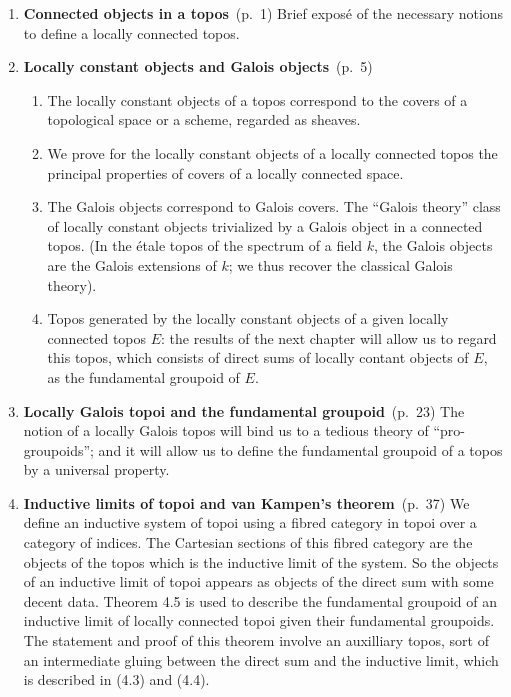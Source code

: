 \documentclass[10pt]{amsart}
\begin{document}
\begin{enumerate}[label=\arabic*.]
  \item \textbf{Connected objects in a topos}~(p.~1)
    Brief expos\'e of the necessary notions to define a locally connected topos.
  \item \textbf{Locally constant objects and Galois objects}~(p.~5)
    \begin{enumerate}[label=2.\arabic*.]
      \item The locally constant objects of a topos correspond to the covers of a topological space or a scheme, regarded as sheaves.
      \item We prove for the locally constant objects of a locally connected topos the principal properties of covers of a locally connected space.
      \item The Galois objects correspond to Galois covers.
        The ``Galois theory'' class of locally constant objects trivialized by a Galois object in a connected topos.
        (In the \'etale topos of the spectrum of a field $k$, the Galois objects are the Galois extensions of $k$;
        we thus recover the classical Galois theory).
      \item Topos generated by the locally constant objects of a given locally connected topos $E$:
        the results of the next chapter will allow us to regard this topos, which consists of direct sums of locally contant objects of $E$, as the fundamental groupoid of $E$.
    \end{enumerate}
  \item \textbf{Locally Galois topoi and the fundamental groupoid}~(p.~23)
    The notion of a locally Galois topos will bind us to a tedious theory of ``pro-groupoids'';
    and it will allow us to define the fundamental groupoid of a topos by a universal property.
  \item \textbf{Inductive limits of topoi and van Kampen's theorem}~(p.~37)
    We define an inductive system of topoi using a fibred category in topoi over a category of indices.
    The Cartesian sections of this fibred category are the objects of the topos which is the inductive limit of the system.
    So the objects of an inductive limit of topoi appears as objects of the direct sum with some decent data.
    Theorem 4.5 is used to describe the fundamental groupoid of an inductive limit of locally connected topoi given their fundamental groupoids.
    The statement and proof of this theorem involve an auxilliary topos, sort of an intermediate gluing between the direct sum and the inductive limit, which is described in (4.3) and (4.4).

\end{enumerate}
\end{document}
